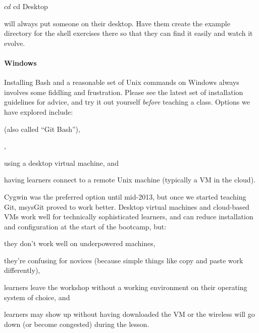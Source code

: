 \documentclass{book}
\begin{document}
\begin{swcitemize}
\begin{VerbIn}
$ cd
$ cd Desktop
\end{VerbIn}

  will always put someone on their desktop. Have them create the example
  directory for the shell exercises there so that they can find it
  easily and watch it evolve.
\end{swcitemize}

\mbox{}\paragraph{Windows}

Installing Bash and a reasonable set of Unix commands on Windows always
involves some fiddling and frustration. Please see the latest set of
installation guidelines for advice, and try it out yourself
\emph{before} teaching a class. Options we have explored include:

\begin{swcenumerate}
\item
   (also called ``Git Bash''),
\item
  ,
\item
  using a desktop virtual machine, and
\item
  having learners connect to a remote Unix machine (typically a VM in
  the cloud).
\end{swcenumerate}

Cygwin was the preferred option until mid-2013, but once we started
teaching Git, msysGit proved to work better. Desktop virtual machines
and cloud-based VMs work well for technically sophisticated learners,
and can reduce installation and configuration at the start of the
bootcamp, but:

\begin{swcenumerate}
\item
  they don't work well on underpowered machines,
\item
  they're confusing for novices (because simple things like copy and
  paste work differently),
\item
  learners leave the workshop without a working environment on their
  operating system of choice, and
\item
  learners may show up without having downloaded the VM or the wireless
  will go down (or become congested) during the lesson.
\end{swcenumerate}
\end{document}
